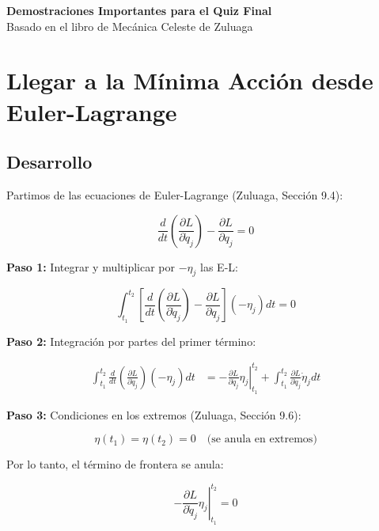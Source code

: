 \documentclass[a4paper]{article}
\begin{document}
\begin{center}
    \huge\textbf{Demostraciones Importantes para el Quiz Final} \\
    \large Basado en el libro de Mecánica Celeste de Zuluaga
\end{center}

\tableofcontents
\newpage

\section{Llegar a la Mínima Acción desde Euler-Lagrange}

\subsection*{Desarrollo}

Partimos de las ecuaciones de Euler-Lagrange (Zuluaga, Sección 9.4):

\begin{equation}
\frac{d}{dt}\left(\frac{\partial L}{\partial \dot{q}_j}\right) - \frac{\partial L}{\partial q_j} = 0
\end{equation}

\textbf{Paso 1:} Integrar y multiplicar por $-\eta_j$ las E-L:

\begin{equation}
\int_{t_1}^{t_2} \left[\frac{d}{dt}\left(\frac{\partial L}{\partial \dot{q}_j}\right) - \frac{\partial L}{\partial q_j}\right](-\eta_j) dt = 0
\end{equation}

\textbf{Paso 2:} Integración por partes del primer término:

\begin{align}
\int_{t_1}^{t_2} \frac{d}{dt}\left(\frac{\partial L}{\partial \dot{q}_j}\right)(-\eta_j) dt &= 
\left.-\frac{\partial L}{\partial \dot{q}_j}\eta_j\right|_{t_1}^{t_2} + \int_{t_1}^{t_2} \frac{\partial L}{\partial \dot{q}_j}\dot{\eta}_j dt
\end{align}

\textbf{Paso 3:} Condiciones en los extremos (Zuluaga, Sección 9.6):

\begin{equation}
\eta(t_1) = \eta(t_2) = 0 \quad \text{(se anula en extremos)}
\end{equation}

Por lo tanto, el término de frontera se anula:

\begin{equation}
\left.-\frac{\partial L}{\partial \dot{q}_j}\eta_j\right|_{t_1}^{t_2} = 0
\end{equation}
\end{document}
